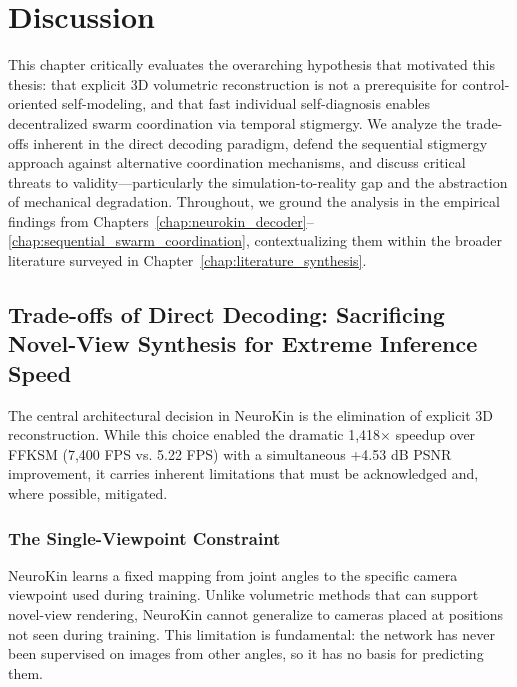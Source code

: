 \documentclass[12pt,a4paper,oneside]{report}
\begin{document}
\clearpage

\chapter{Discussion}
\label{chap:discussion_main}

This chapter critically evaluates the overarching hypothesis that motivated this thesis: that explicit 3D volumetric reconstruction is not a prerequisite for control-oriented self-modeling, and that fast individual self-diagnosis enables decentralized swarm coordination via temporal stigmergy. We analyze the trade-offs inherent in the direct decoding paradigm, defend the sequential stigmergy approach against alternative coordination mechanisms, and discuss critical threats to validity---particularly the simulation-to-reality gap and the abstraction of mechanical degradation. Throughout, we ground the analysis in the empirical findings from Chapters~\ref{chap:neurokin_decoder}--\ref{chap:sequential_swarm_coordination}, contextualizing them within the broader literature surveyed in Chapter~\ref{chap:literature_synthesis}.

\section{Trade-offs of Direct Decoding: Sacrificing Novel-View Synthesis for Extreme Inference Speed}

The central architectural decision in NeuroKin is the elimination of explicit 3D reconstruction. While this choice enabled the dramatic 1,418$\times$ speedup over FFKSM (7,400 FPS vs. 5.22 FPS) with a simultaneous +4.53 dB PSNR improvement, it carries inherent limitations that must be acknowledged and, where possible, mitigated.

\subsection{The Single-Viewpoint Constraint}

NeuroKin learns a fixed mapping from joint angles to the specific camera viewpoint used during training. Unlike volumetric methods that can support novel-view rendering, NeuroKin cannot generalize to cameras placed at positions not seen during training. This limitation is fundamental: the network has never been supervised on images from other angles, so it has no basis for predicting them.
\end{document}
